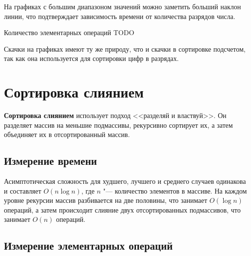 \documentclass[11pt]{article}
\begin{document}
На графиках с большим диапазоном значений можно заметить больший наклон линии, что подтверждает зависимость
времени от количества разрядов числа.

Количество элементарных операций TODO

Скачки на графиках имеют ту же природу, что и скачки в сортировке подсчетом, так как она используется для сортировки
цифр в разрядах.

\newpage

\setcounter{section}{9}
\section*{\centering Сортировка слиянием}

\textbf{Сортировка слиянием} использует подход <<разделяй и властвуй>>. Он разделяет массив на меньшие подмассивы,
рекурсивно сортирует их, а затем объединяет их в отсортированный массив.

\setcounter{subsection}{0}
\subsection{Измерение времени}

\begin{center}
\end{center}
{ \hspace*{\fill} }

\begin{center}
\end{center}
{ \hspace*{\fill} }

Асимптотическая сложность для худшего, лучшего и среднего случаев одинакова и составляет $O(n\log n)$,
где $n$ "--- количество элементов в массиве. На каждом уровне рекурсии массив разбивается на две половины,
что занимает $O(\log n)$ операций, а затем происходит слияние двух отсортированных подмассивов, что занимает $O(n)$ операций.

\subsection{Измерение элементарных операций}

\begin{center}
\end{center}
{ \hspace*{\fill} }
\end{document}
